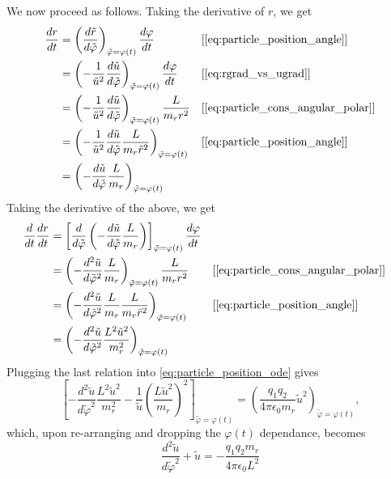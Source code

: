 \documentclass[oneside,a4paper,11pt]{report}
\begin{document}
We now proceed as follows. Taking the derivative of $r$, we get
\begin{align}
    \label{eq:particle_derivation_1}
    \frac{dr}{dt} &= \left ( \frac{d \tilde{r}}{d\tilde{\varphi}} \right )_{\tilde{\varphi} = \varphi(t)} \frac{d \varphi}{dt} &&[\cref{eq:particle_position_angle}] \nonumber \\
    &= \left ( -\frac{1}{\tilde{u}^2} \frac{d\tilde{u}}{d\tilde{\varphi}} \right )_{\tilde{\varphi} = \varphi(t)} \frac{d \varphi}{dt} &&[\cref{eq:rgrad_vs_ugrad}]\nonumber \\ 
    &= \left ( -\frac{1}{\tilde{u}^2} \frac{d\tilde{u}}{d\tilde{\varphi}} \right )_{\tilde{\varphi} = \varphi(t)} \frac{L}{m_r r^2} &&[\cref{eq:particle_cons_angular_polar}] \nonumber \\
    &= \left ( -\frac{1}{\tilde{u}^2} \frac{d\tilde{u}}{d\tilde{\varphi}} \frac{L}{m_r \tilde{r}^2} \right )_{\tilde{\varphi} = \varphi(t)} &&[\cref{eq:particle_position_angle}] \nonumber \\
    &= \left ( - \frac{d\tilde{u}}{d\tilde{\varphi}} \frac{L}{m_r} \right )_{\tilde{\varphi} = \varphi(t)}
\end{align}
Taking the derivative of the above, we get
\begin{align}
    \frac{d}{dt} \frac{dr}{dt} &= \left [ \frac{d}{d\tilde{\varphi}} \left ( - \frac{d\tilde{u}}{d\tilde{\varphi}} \frac{L}{m_r} \right ) \right ]_{\tilde{\varphi} = \varphi(t)} \frac{d \varphi}{dt} \nonumber \\
    &= \left ( - \frac{d^2 \tilde{u}}{d\tilde{\varphi}^2} \frac{L}{m_r} \right )_{\tilde{\varphi} = \varphi(t)} \frac{L}{m_r r^2} && [\cref{eq:particle_cons_angular_polar}] \nonumber \\
    &= \left ( - \frac{d^2 \tilde{u}}{d\tilde{\varphi}^2} \frac{L}{m_r} \frac{L}{m_r \tilde{r}^2} \right )_{\tilde{\varphi} = \varphi(t)} && [\cref{eq:particle_position_angle}] \nonumber \\
    &= \left ( - \frac{d^2 \tilde{u}}{d\tilde{\varphi}^2} \frac{L^2 \tilde{u}^2}{m_r^2} \right )_{\tilde{\varphi} = \varphi(t)}
\end{align}
Plugging the last relation into \cref{eq:particle_position_ode} gives
\begin{equation}
    \left [ - \frac{d^2 \tilde{u}}{d\tilde{\varphi}^2} \frac{L^2 \tilde{u}^2}{m_r^2} - \frac{1}{\tilde{u}} \left ( \frac{L \tilde{u}^2}{m_r} \right )^2 \right ]_{\tilde{\varphi} = \varphi(t)} = \left ( \frac{q_1 q_2}{4 \pi \epsilon_0 m_r} \tilde{u}^2 \right )_{\tilde{\varphi} = \varphi(t)},
\end{equation}
which, upon re-arranging and dropping the $\varphi(t)$ dependance, becomes
\begin{equation}
    \frac{d^2 \tilde{u}}{d \tilde{\varphi}^2} + \tilde{u} = -\frac{q_1 q_2 m_r}{4 \pi \epsilon_0 L^2}
\end{equation}
\end{document}
